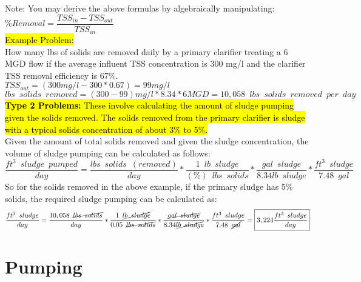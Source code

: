 Note:  You may derive the above formulas by algebraically manipulating: $\%Removal=\dfrac{TSS_{in} -TSS_{out}}{TSS_{in}}$\\
\hl{Example Problem:}\\
How many lbs of solids are removed daily by a primary clarifier treating a 6 MGD flow if the average influent TSS concentration is 300 mg/l and the clarifier TSS removal efficiency is 67\%.\\
$TSS_{out}=(300mg/l - 300*0.67)=99mg/l$\\
$lbs \enspace solids \enspace  removed = (300-99)mg/l*8.34*6MGD=\boxed{10,058 \enspace lbs \enspace solids \enspace removed \enspace per \enspace day}$\\
\vspace{0.5cm}
\hl{\textbf{Type 2 Problems:}  These involve calculating the amount of sludge pumping given the solids removed.  The solids removed from the primary clarifier is sludge with a typical solids concentration of about 3\% to 5\%.}\\
Given the amount of total solids removed and given the sludge concentration, the volume of sludge pumping can be calculated as follows:  $$\dfrac{ft^3\enspace sludge\enspace pumped}{ day}= \dfrac{lbs \enspace solids \enspace (removed)}{day} * \dfrac{1 \enspace lb \enspace sludge}{(\%)\enspace lbs \enspace solids}*\dfrac{gal \enspace sludge}{8.34lb \enspace sludge}*\dfrac{ft^3 \enspace sludge}{7.48 \enspace gal} $$
So for the solids removed in the above example, if the primary sludge has 5\% solids, the required sludge pumping can be calculated as:
$$\dfrac{ft^3\enspace sludge}{day}= \dfrac{10,058 \enspace \cancel{lbs \enspace solids}}{day} * \dfrac{1 \enspace \cancel{lb \enspace sludge}}{0.05\enspace \cancel{lbs \enspace solids}}*\dfrac{\cancel{gal \enspace sludge}}{8.34\cancel{lb \enspace sludge}}*\dfrac{ft^3 \enspace sludge}{7.48 \enspace \cancel{gal}}=\boxed{3,224\dfrac{ft^3 \enspace sludge}{day}} $$

\section{Pumping}
